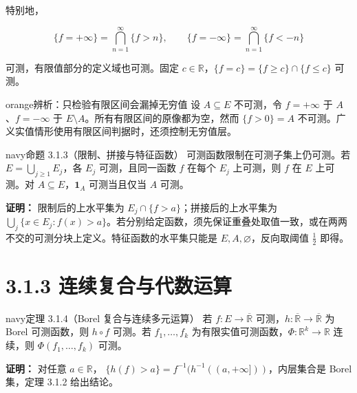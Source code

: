 \documentclass[11pt,a4paper]{article}
\begin{document}
特别地，

\begin{equation*}
\{f=+\infty\}=\bigcap_{n=1}^{\infty}\{f>n\},\qquad
\{f=-\infty\}=\bigcap_{n=1}^{\infty}\{f<-n\}
\tag{3.1.2}
\end{equation*}

可测，有限值部分的定义域也可测。固定
\(c\in\mathbb R\)，\(\{f=c\}=\{f\ge c\}\cap\{f\le c\}\) 可测。

\begin{sboxenv}{orange}{辨析：只检验有限区间会漏掉无穷值}
设 \(A\subseteq E\) 不可测，令 \(f=+\infty\) 于 \(A\)、\(f=-\infty\) 于
\(E\setminus A\)。所有有限区间的原像都为空，然而 \(\{f>0\}=A\)
不可测。广义实值情形使用有限区间判据时，还须控制无穷值层。

\end{sboxenv}

\begin{sboxenv}{navy}{命题 3.1.3（限制、拼接与特征函数）}
可测函数限制在可测子集上仍可测。若 \(E=\bigcup_{j\ge1}E_j\)，各 \(E_j\)
可测，且同一函数 \(f\) 在每个 \(E_j\) 上可测，则 \(f\) 在 \(E\)
上可测。对 \(A\subseteq E\)，\(\mathbf1_A\) 可测当且仅当 \(A\) 可测。

\end{sboxenv}

\textbf{证明：} 限制后的上水平集为
\(E_j\cap\{f>a\}\)；拼接后的上水平集为
\(\bigcup_j\{x\in E_j:f(x)>a\}\)。若分别给定函数，须先保证重叠处取值一致，或在两两不交的可测分块上定义。特征函数的水平集只能是
\(E,A,\varnothing\)，反向取阈值 \(\frac12\) 即得。

\section[\S{}3.1.3
连续复合与代数运算]{3.1.3
连续复合与代数运算}\label{ux8fdeux7eedux590dux5408ux4e0eux4ee3ux6570ux8fd0ux7b97}

\begin{sboxenv}{navy}{定理 3.1.4（Borel 复合与连续多元运算）}
若 \(f:E\to\overline{\mathbb R}\)
可测，\(h:\overline{\mathbb R}\to\overline{\mathbb R}\) 为 Borel
可测函数，则 \(h\circ f\) 可测。若 \(f_1,\ldots,f_k\)
为有限实值可测函数，\(\Phi:\mathbb R^k\to\mathbb R\) 连续，则
\(\Phi(f_1,\ldots,f_k)\) 可测。

\end{sboxenv}

\textbf{证明：} 对任意 \(a\in\mathbb R\)，
\(\{h(f)>a\}=f^{-1}(h^{-1}((a,+\infty]))\)，内层集合是 Borel 集，定理
3.1.2 给出结论。
\end{document}
